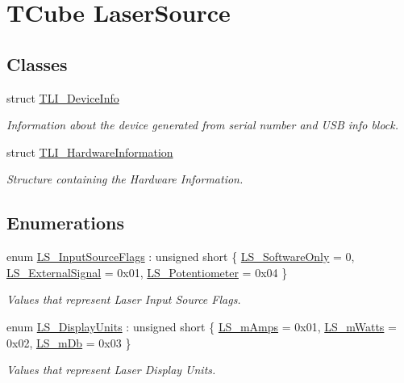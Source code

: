 \hypertarget{group___t_cube_laser_source}{}\section{T\+Cube Laser\+Source}
\label{group___t_cube_laser_source}
\subsection*{Classes}
\begin{DoxyCompactItemize}
\item 
struct \hyperlink{struct_t_l_i___device_info}{T\+L\+I\+\_\+\+Device\+Info}
\begin{DoxyCompactList}\small\item\em Information about the device generated from serial number and U\+SB info block. \end{DoxyCompactList}\item 
struct \hyperlink{struct_t_l_i___hardware_information}{T\+L\+I\+\_\+\+Hardware\+Information}
\begin{DoxyCompactList}\small\item\em Structure containing the Hardware Information. \end{DoxyCompactList}\end{DoxyCompactItemize}
\subsection*{Enumerations}
\begin{DoxyCompactItemize}
\item 
enum \hyperlink{group___t_cube_laser_source_ga991a5ee25e849a2a71854d7537b7fd68}{L\+S\+\_\+\+Input\+Source\+Flags} \+: unsigned short \{ \hyperlink{group___t_cube_laser_source_gga991a5ee25e849a2a71854d7537b7fd68a4d141ef57e1fcf0921e5133567f9674c}{L\+S\+\_\+\+Software\+Only} = 0, 
\hyperlink{group___t_cube_laser_source_gga991a5ee25e849a2a71854d7537b7fd68a3071893ad31d8a9494c53b311347622d}{L\+S\+\_\+\+External\+Signal} = 0x01, 
\hyperlink{group___t_cube_laser_source_gga991a5ee25e849a2a71854d7537b7fd68a1f16b10734b6ae4be8692ade9b97296a}{L\+S\+\_\+\+Potentiometer} = 0x04
 \}\begin{DoxyCompactList}\small\item\em Values that represent Laser Input Source Flags. \end{DoxyCompactList}
\item 
enum \hyperlink{group___t_cube_laser_source_ga4984a8836d4912e01e360688c22ce0ef}{L\+S\+\_\+\+Display\+Units} \+: unsigned short \{ \hyperlink{group___t_cube_laser_source_gga4984a8836d4912e01e360688c22ce0efa701c64696987a1be38622c1f9d91f001}{L\+S\+\_\+m\+Amps} = 0x01, 
\hyperlink{group___t_cube_laser_source_gga4984a8836d4912e01e360688c22ce0efa6100dd99552546a3d895069752c3556f}{L\+S\+\_\+m\+Watts} = 0x02, 
\hyperlink{group___t_cube_laser_source_gga4984a8836d4912e01e360688c22ce0efa3130102ab6a8272ec56bfd55ab0099a7}{L\+S\+\_\+m\+Db} = 0x03
 \}\begin{DoxyCompactList}\small\item\em Values that represent Laser Display Units. \end{DoxyCompactList}
\end{DoxyCompactItemize}

